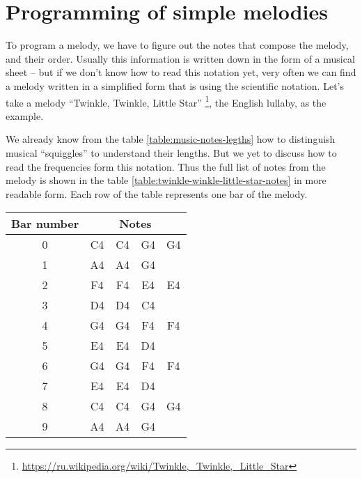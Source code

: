 \documentclass[../sparc.tex]{subfiles}
\begin{document}
\section{Programming of simple melodies}

To program a melody, we have to figure out the notes that compose the melody,
and their order.  Usually this information is written down in the form of a
musical sheet -- but if we don't know how to read this notation yet, very often
we can find a melody written in a simplified form that is using the scientific
notation.  Let's take a melody ``Twinkle, Twinkle, Little
Star'' \footnote{\url{https://ru.wikipedia.org/wiki/Twinkle,_Twinkle,_Little_Star}}, the English lullaby, as the example.


We already know from the table \ref{table:music-notes-legths} how to distinguish
musical ``squiggles'' to understand their lengths.  But we yet to discuss how to
read the frequencies form this notation.  Thus the full list of notes from the
melody is shown in the table \ref{table:twinkle-winkle-little-star-notes} in
more readable form.  Each row of the table represents one bar of the melody.

\begin{table}[ht]
  \centering
  \begin{tabular}{|*{5}{c|}}
    \hline
    \textbf{Bar number} & \multicolumn{4}{c|}{\textbf{Notes}} \\
    \hline
    0 & C4 & C4 & G4 & G4 \\
    \hline
    1 & A4 & A4 & G4 & \\
    \hline
    2 & F4 & F4 & E4 & E4 \\
    \hline
    3 & D4 & D4 & C4 & \\
    \hline
    4 & G4 & G4 & F4 & F4 \\
    \hline
    5 & E4 & E4 & D4 & \\
    \hline
    6 & G4 & G4 & F4 & F4 \\
    \hline
    7 & E4 & E4 & D4 & \\
    \hline
    8 & C4 & C4 & G4 & G4 \\
    \hline
    9 & A4 & A4 & G4 & \\
    \hline
  \end{tabular}
  \label{table:twinkle-twinkle-little-star-notes}
\end{table}
\end{document}
